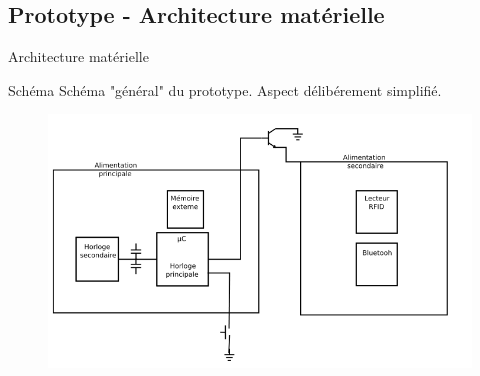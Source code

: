 \subsection{Prototype - Architecture matérielle}
\begin{frame}{Architecture matérielle}
	\begin{block}{Schéma}
        Schéma "général" du prototype. Aspect délibérement simplifié.
	\end{block}

    \begin{figure}[h]
        \begin{center}
            \includegraphics[scale=0.4]{images/protoSchema.png} 
        \end{center}
     \end{figure} 
\end{frame}
